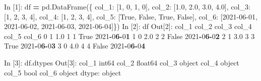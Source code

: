 \documentclass[
]{book}
\newenvironment{Shaded}{\begin{snugshade}}{\end{snugshade}}
\newcommand{\BuiltInTok}[1]{#1}
\newcommand{\DecValTok}[1]{\textcolor[rgb]{0.00,0.00,0.81}{#1}}
\newcommand{\ErrorTok}[1]{\textcolor[rgb]{0.64,0.00,0.00}{\textbf{#1}}}
\newcommand{\FloatTok}[1]{\textcolor[rgb]{0.00,0.00,0.81}{#1}}
\newcommand{\NormalTok}[1]{#1}
\newcommand{\OperatorTok}[1]{\textcolor[rgb]{0.81,0.36,0.00}{\textbf{#1}}}
\newcommand{\StringTok}[1]{\textcolor[rgb]{0.31,0.60,0.02}{#1}}
\newcommand{\VariableTok}[1]{\textcolor[rgb]{0.00,0.00,0.00}{#1}}
\begin{document}
\begin{Shaded}
\begin{Highlighting}[]
\NormalTok{In [}\DecValTok{1}\NormalTok{]: df }\OperatorTok{=}\NormalTok{ pd.DataFrame(\{}
                   \StringTok{\textquotesingle{}col\_1\textquotesingle{}}\NormalTok{: [}\DecValTok{1}\NormalTok{, }\DecValTok{0}\NormalTok{, }\DecValTok{1}\NormalTok{, }\DecValTok{0}\NormalTok{], }
                   \StringTok{\textquotesingle{}col\_2\textquotesingle{}}\NormalTok{: [}\FloatTok{1.0}\NormalTok{, }\FloatTok{2.0}\NormalTok{, }\FloatTok{3.0}\NormalTok{, }\FloatTok{4.0}\NormalTok{], }
                   \StringTok{\textquotesingle{}col\_3\textquotesingle{}}\NormalTok{: [}\StringTok{\textquotesingle{}1\textquotesingle{}}\NormalTok{, }\StringTok{\textquotesingle{}2\textquotesingle{}}\NormalTok{, }\StringTok{\textquotesingle{}3\textquotesingle{}}\NormalTok{, }\StringTok{\textquotesingle{}4\textquotesingle{}}\NormalTok{],}
                   \StringTok{\textquotesingle{}col\_4\textquotesingle{}}\NormalTok{: [}\StringTok{\textquotesingle{}1\textquotesingle{}}\NormalTok{, }\DecValTok{2}\NormalTok{, }\StringTok{\textquotesingle{}3\textquotesingle{}}\NormalTok{, }\DecValTok{4}\NormalTok{],}
                   \StringTok{\textquotesingle{}col\_5\textquotesingle{}}\NormalTok{: [}\VariableTok{True}\NormalTok{, }\VariableTok{False}\NormalTok{, }\VariableTok{True}\NormalTok{, }\VariableTok{False}\NormalTok{],}
                   \StringTok{\textquotesingle{}col\_6\textquotesingle{}}\NormalTok{: [}\StringTok{\textquotesingle{}2021{-}06{-}01\textquotesingle{}}\NormalTok{, }\StringTok{\textquotesingle{}2021{-}06{-}02\textquotesingle{}}\NormalTok{, }\StringTok{\textquotesingle{}2021{-}06{-}03\textquotesingle{}}\NormalTok{, }\StringTok{\textquotesingle{}2021{-}06{-}04\textquotesingle{}}\NormalTok{]\})}
\NormalTok{In [}\DecValTok{2}\NormalTok{]: df}
\NormalTok{Out[}\DecValTok{2}\NormalTok{]:}
\NormalTok{   col\_1  col\_2 col\_3 col\_4  col\_5       col\_6}
\DecValTok{0}      \DecValTok{1}    \FloatTok{1.0}     \DecValTok{1}     \DecValTok{1}   \VariableTok{True}  \DecValTok{2021}\OperatorTok{{-}}\DecValTok{0}\ErrorTok{6}\OperatorTok{{-}}\DecValTok{0}\ErrorTok{1}
\DecValTok{1}      \DecValTok{0}    \FloatTok{2.0}     \DecValTok{2}     \DecValTok{2}  \VariableTok{False}  \DecValTok{2021}\OperatorTok{{-}}\DecValTok{0}\ErrorTok{6}\OperatorTok{{-}}\DecValTok{0}\ErrorTok{2}
\DecValTok{2}      \DecValTok{1}    \FloatTok{3.0}     \DecValTok{3}     \DecValTok{3}   \VariableTok{True}  \DecValTok{2021}\OperatorTok{{-}}\DecValTok{0}\ErrorTok{6}\OperatorTok{{-}}\DecValTok{0}\ErrorTok{3}
\DecValTok{3}      \DecValTok{0}    \FloatTok{4.0}     \DecValTok{4}     \DecValTok{4}  \VariableTok{False}  \DecValTok{2021}\OperatorTok{{-}}\DecValTok{0}\ErrorTok{6}\OperatorTok{{-}}\DecValTok{0}\ErrorTok{4}

\NormalTok{In [}\DecValTok{3}\NormalTok{]: df.dtypes}
\NormalTok{Out[}\DecValTok{3}\NormalTok{]:}
\NormalTok{col\_1      int64}
\NormalTok{col\_2    float64}
\NormalTok{col\_3     }\BuiltInTok{object}
\NormalTok{col\_4     }\BuiltInTok{object}
\NormalTok{col\_5       }\BuiltInTok{bool}
\NormalTok{col\_6     }\BuiltInTok{object}
\NormalTok{dtype: }\BuiltInTok{object}
\end{Highlighting}
\end{Shaded}
\end{document}
